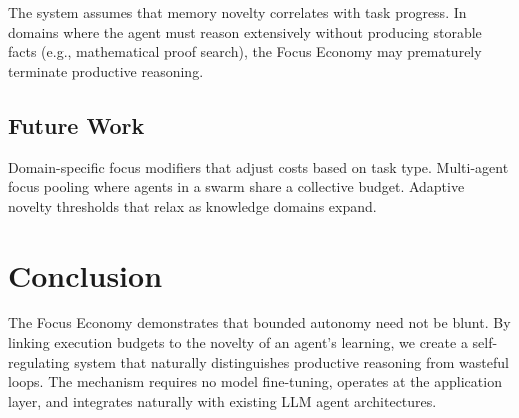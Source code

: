 \documentclass[man,12pt,floatsintext]{apa7}
\begin{document}
The system assumes that memory novelty correlates with task progress. In domains where
the agent must reason extensively without producing storable facts (e.g., mathematical
proof search), the Focus Economy may prematurely terminate productive reasoning.

\subsection{Future Work}

Domain-specific focus modifiers that adjust costs based on task type. Multi-agent focus
pooling where agents in a swarm share a collective budget. Adaptive novelty thresholds
that relax as knowledge domains expand.

\section{Conclusion}

The Focus Economy demonstrates that bounded autonomy need not be blunt. By linking
execution budgets to the novelty of an agent's learning, we create a self-regulating
system that naturally distinguishes productive reasoning from wasteful loops. The
mechanism requires no model fine-tuning, operates at the application layer, and
integrates naturally with existing LLM agent architectures.

\printbibliography
\end{document}
